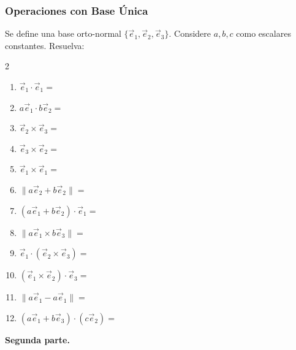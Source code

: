 \subsubsection{Operaciones con Base Única}
Se define una base orto-normal $\{\vec{e}_1, \vec{e}_2, \vec{e}_3\}$. Considere $a, b, c$ como escalares constantes. Resuelva:

\begin{multicols}{2}
\begin{enumerate}
    \item $\vec{e}_1 \cdot \vec{e}_1 =$
    \item $a\vec{e}_1 \cdot b\vec{e}_2 =$
    \item $\vec{e}_2 \times \vec{e}_3 =$
    \item $\vec{e}_3 \times \vec{e}_2 =$
    \item $\vec{e}_1 \times \vec{e}_1 =$
    \item $\| a\vec{e}_2 + b\vec{e}_2 \| =$
    \item $(a\vec{e}_1 + b\vec{e}_2) \cdot \vec{e}_1 =$
    \item $\| a\vec{e}_1 \times b\vec{e}_3 \| =$
    \item $\vec{e}_1 \cdot (\vec{e}_2 \times \vec{e}_3) =$
    \item $(\vec{e}_1 \times \vec{e}_2) \cdot \vec{e}_3 =$
    \item $\| a\vec{e}_1 - a\vec{e}_1 \| =$
    \item $(a\vec{e}_1 + b\vec{e}_3) \cdot (c\vec{e}_2) =$
\end{enumerate}
\end{multicols}
\textbf{Segunda parte.}
  
